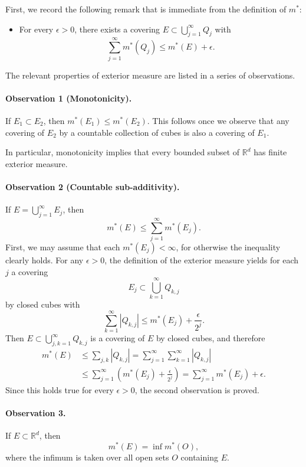 \documentclass[11pt,openany]{book}
\begin{document}
First, we record the following remark that is immediate from the definition of $m^*$:
\begin{itemize}
\item For every $\epsilon>0$, there exists a covering $E\subset\bigcup_{j=1}^{\infty}Q_j$ with
\[
 \sum_{j=1}^{\infty}m^*(Q_j)\le m^*(E)+\epsilon.
\]
\end{itemize}

The relevant properties of exterior measure are listed in a series of observations.

\paragraph{Observation 1 (Monotonicity).} If $E_1\subset E_2$, then $m^*(E_1)\le m^*(E_2)$. This follows once we observe that any covering of $E_2$ by a countable collection of cubes is also a covering of $E_1$.

In particular, monotonicity implies that every bounded subset of $\mathbb{R}^d$ has finite exterior measure.

\paragraph{Observation 2 (Countable sub-additivity).} If $E=\bigcup_{j=1}^{\infty}E_j$, then
\[
 m^*(E)\le\sum_{j=1}^{\infty}m^*(E_j).
\]
First, we may assume that each $m^*(E_j)<\infty$, for otherwise the inequality clearly holds. For any $\epsilon>0$, the definition of the exterior measure yields for each $j$ a covering
\[
 E_j\subset\bigcup_{k=1}^{\infty}Q_{k,j}
\]
by closed cubes with
\[
 \sum_{k=1}^{\infty}|Q_{k,j}|\le m^*(E_j)+\frac{\epsilon}{2^j}.
\]
Then $E\subset\bigcup_{j,k=1}^{\infty}Q_{k,j}$ is a covering of $E$ by closed cubes, and therefore
\[
\begin{aligned}
 m^*(E)
 &\le \sum_{j,k}|Q_{k,j}|
 =\sum_{j=1}^{\infty}\sum_{k=1}^{\infty}|Q_{k,j}|\\
 &\le\sum_{j=1}^{\infty}\left(m^*(E_j)+\frac{\epsilon}{2^j}\right)
 =\sum_{j=1}^{\infty}m^*(E_j)+\epsilon.
\end{aligned}
\]
Since this holds true for every $\epsilon>0$, the second observation is proved.

\paragraph{Observation 3.} If $E\subset\mathbb{R}^d$, then
\[
 m^*(E)=\inf m^*(O),
\]
where the infimum is taken over all open sets $O$ containing $E$.
\end{document}
